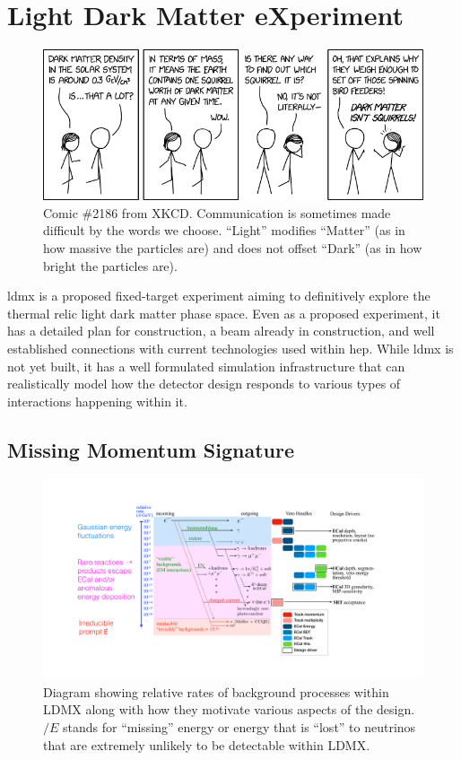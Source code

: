 \chapter{Light Dark Matter eXperiment}
\label{chapter:ldmx:experiment}

\begin{figure}
  \centering
  \includegraphics[width=\textwidth]{figures/dark_matter-xkcd-2186.png}
  \caption{Comic \#2186 from XKCD\cite{xkcd}.
  Communication is sometimes made difficult by the words we choose.
  ``Light'' modifies ``Matter'' (as in how massive the particles are)
  and does not offset ``Dark'' (as in how bright the particles are).
  }
\end{figure}

\ac{ldmx} is a proposed fixed-target experiment aiming to definitively explore
the thermal relic light dark matter phase space. Even as a proposed experiment, it has a detailed
plan for construction, a beam already in construction, and well established connections
with current technologies used within \ac{hep}. While \ac{ldmx} is not yet built,
it has a well formulated simulation infrastructure that can realistically model
how the detector design responds to various types of interactions happening within it.

\section{Missing Momentum Signature}

\begin{figure}
  \centering
  \includegraphics[width=\textwidth]{figures/ldmx/experiment/reaction_staircase_with_designDrivers.pdf}
  \caption{
    Diagram showing relative rates of background processes within LDMX along with
    how they motivate various aspects of the design. $\slash{E}$ stands for ``missing''
    energy or energy that is ``lost'' to neutrinos that are extremely unlikely to be
    detectable within LDMX.
  }
  \label{fig:ldmx-bkgd-staircase}
\end{figure}

